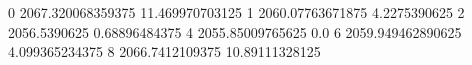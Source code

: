 0 2067.320068359375 11.469970703125
1 2060.07763671875 4.2275390625
2 2056.5390625 0.68896484375
4 2055.85009765625 0.0
6 2059.949462890625 4.099365234375
8 2066.7412109375 10.89111328125
